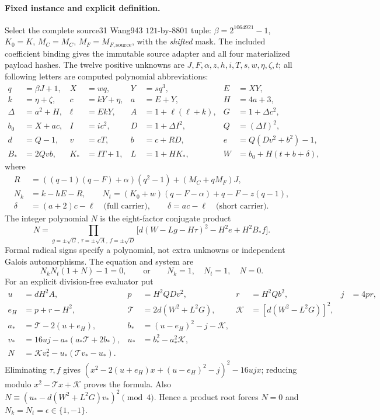 \paragraph{Fixed instance and explicit definition.}
Select the complete source31 Wang943 $121$-by-$8801$ tuple:
$\beta=2^{1064921}-1$, $K_0=K$, $M_C=M_C$, $M_F=M_{F,\mathrm{source}}$,
with the \emph{shifted} mask.  The included coefficient binding gives the
immutable source adapter and all four materialized payload hashes.  The twelve positive
unknowns are $J,F,\alpha,z,h,i,T,s,w,\eta,\zeta,t$; all following letters
are computed polynomial abbreviations:
\begin{align*}
 q&=\beta J+1,& X&=wq,&Y&=sq^3,&E&=XY,\\
 k&=\eta+\zeta,&c&=kY+\eta,&a&=E+Y,&H&=4a+3,\\
 \Delta&=a^2+H,&\ell&=EkY,&A&=1+\ell(\ell+k),&G&=1+\Delta c^2,\\
 b_0&=X+ac,&I&=ic^2,&D&=1+\Delta I^2,&Q&=(\Delta I)^2,\\
 d&=Q-1,&v&=cT,&b&=c+RD,&e&=Q(Dv^2+b^2)-1,\\
 B_*&=2Qvb,&K_*&=IT+1,&L&=1+HK_*,&W&=b_0+H(t+b+\delta),
\end{align*}
where
\begin{align*}
R&=((q-1)(q-F)+\alpha)(q^2-1)+(M_C+qM_F)J,\\
N_k&=k-hE-R,\qquad
N_t=(K_0+w)(q-F-\alpha)+q-F-z(q-1),\\
\delta&=(a+2)c-\ell\quad\text{(full carrier)},\qquad
\delta=ac-\ell\quad\text{(short carrier)}.
\end{align*}
The integer polynomial $N$ is the eight-factor conjugate product
\[
 N=\prod_{g=\pm\sqrt G,\,\tau=\pm\sqrt A,\,f=\pm\sqrt D}
 \bigl[d(W-Lg-H\tau)^2-H^2e+H^2B_*f\bigr].
\]
Formal radical signs specify a polynomial, not extra unknowns or independent
Galois automorphisms.  The equation and system are
\[
 N_kN_t(1+N)-1=0,\qquad\text{or}\qquad N_k=1,\quad N_t=1,\quad N=0.
\]
For an explicit division-free evaluator put
\begin{align*}
 u&=dH^2A,&p&=H^2QDv^2,&r&=H^2Qb^2,&j&=4pr,\\
 e_H&=p+r-H^2,&\mathcal T&=2d(W^2+L^2G),&\mathcal K&=[d(W^2-L^2G)]^2,\\
 a_*&=\mathcal T-2(u+e_H),&b_*&=(u-e_H)^2-j-\mathcal K,\\
 v_*&=16uj-a_*(a_*\mathcal T+2b_*),&u_*&=b_*^2-a_*^2\mathcal K,\\
 N&=\mathcal K v_*^2-u_*(\mathcal T v_*-u_*).
\end{align*}
Eliminating $\tau,f$ gives $(x^2-2(u+e_H)x+(u-e_H)^2-j)^2-16ujx$;
reducing modulo $x^2-\mathcal T x+\mathcal K$ proves the formula.
Also $N\equiv(u_*-d(W^2+L^2G)v_*)^2\pmod4$.  Hence a product root
forces $N=0$ and $N_k=N_t=\epsilon\in\{1,-1\}$.

